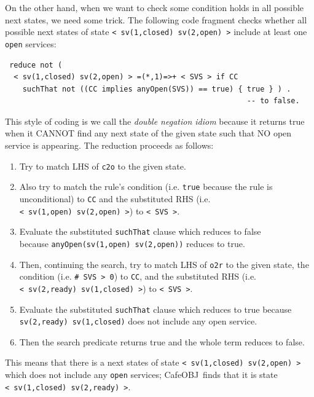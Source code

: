 \documentclass[12pt]{report}
\newcommand{\stt}[1]{{\small{\tt {#1}}}}
\newcommand{\cafeobj}{{\sf CafeOBJ}~}
\begin{document}
On the other hand, when we want to check some condition holds in all
possible next states, we need some trick. The following code fragment
checks whether all possible next states of state
\stt{<~sv(1,closed)~sv(2,open)~>} include at least one {\tt open} services:
\begin{verbatim}
 reduce not (
  < sv(1,closed) sv(2,open) > =(*,1)=>+ < SVS > if CC
    suchThat not ((CC implies anyOpen(SVS)) == true) { true } ) .
                                                       -- to false.
\end{verbatim}
This style of coding is we call the {\it double negation idiom}
because it returns true when it CANNOT find any next state of the
given state such that NO open service is appearing. The reduction
proceeds as follows:
\begin{enumerate}
\item Try to match LHS of {\tt c2o} to the given state.
\item Also try to match the rule's condition (i.e. {\tt true} because
  the rule is unconditional) to {\tt CC} and the substituted RHS
  (i.e. \stt{<~sv(1,open)~sv(2,open)~>}) to \stt{<~SVS~>}.
\item Evaluate the substituted {\tt suchThat} clause which reduces to
  false \\ because \stt{anyOpen(sv(1,open) sv(2,open))} reduces to
  true.
\item Then, continuing the search, try to match LHS of {\tt o2r} to
  the given state, the condition (i.e. \stt{\# SVS > 0}) to {\tt CC},
  and the substituted RHS (i.e. \stt{<~sv(2,ready)~sv(1,closed)~>}) to
  \stt{<~SVS~>}.
\item Evaluate the substituted {\tt suchThat} clause which reduces to
  true because \stt{sv(2,ready) sv(1,closed)} does not include any
  open service.
\item Then the search predicate returns true and the whole term
  reduces to false.
\end{enumerate}
This means that there is a next states of state
\stt{<~sv(1,closed)~sv(2,open)~>} which does not include any {\tt open}
services; \cafeobj finds that it is state
\stt{<~sv(1,closed)~sv(2,ready)~>}.
\end{document}
